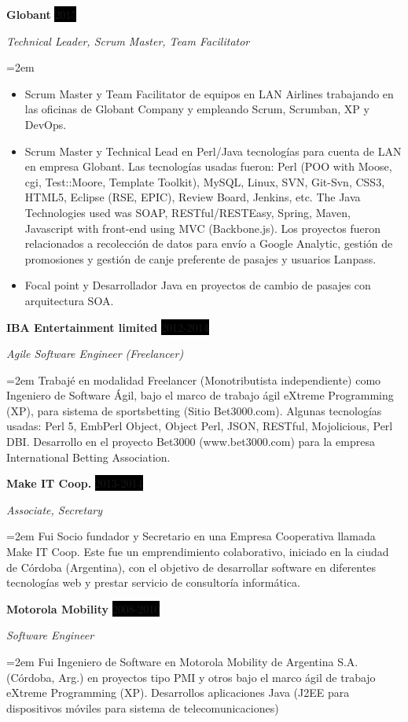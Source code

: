 \documentclass[paper=a4,fontsize=11pt]{scrartcl} %
\newcommand{\sepspace}{\vspace*{1em}}		%
\newcommand{\EducationEntry}[4]{
		\noindent \textbf{#1} \hfill      %
		\colorbox{Black}{%
			\parbox{6em}{%
			\hfill\color{White}#2}} \par  %
		\noindent \textit{#3} \par        %
		\noindent\hangindent=2em\hangafter=0 \small #4 %
		\normalsize \par}
\newcommand{\WorkEntry}[4]{				  %
		\noindent \textbf{#1} \hfill      %
		\colorbox{Black}{\color{White}#2} \par  %
		\noindent \textit{#3} \par              %
		\noindent\hangindent=2em\hangafter=0 \small #4 %
		\normalsize \par}
\begin{document}
\sepspace

\WorkEntry{Globant}{2015}{Technical Leader, Scrum Master, Team Facilitator}
{
\begin{itemize}
\item Scrum Master y Team Facilitator de equipos en LAN Airlines trabajando en las oficinas de Globant Company y empleando Scrum, Scrumban, XP y DevOps.
\item Scrum Master y Technical Lead en Perl/Java tecnologías para cuenta de LAN en empresa Globant. Las tecnologías usadas fueron: Perl (POO with Moose, cgi, Test::Moore, Template Toolkit), MySQL, Linux, SVN, Git-Svn, CSS3, HTML5, Eclipse (RSE, EPIC), Review Board, Jenkins, etc. The Java Technologies used was SOAP, RESTful/RESTEasy, Spring, Maven, Javascript with front-end using MVC (Backbone.js). Los proyectos fueron  relacionados a recolección de datos para envío a Google Analytic, gestión de promosiones y gestión de canje preferente de pasajes y usuarios Lanpass.
\item Focal point y Desarrollador Java en proyectos de cambio de pasajes con arquitectura SOA.
\end{itemize}
}

\sepspace

\WorkEntry{IBA Entertainment limited}{2012-2014}{Agile Software Engineer (Freelancer)}
{Trabajé en modalidad Freelancer (Monotributista independiente) como Ingeniero de Software Ágil, bajo el marco de trabajo ágil eXtreme Programming (XP), para sistema de sportsbetting (Sitio Bet3000.com). Algunas tecnologías usadas: Perl 5, EmbPerl Object, Object Perl, JSON, RESTful, Mojolicious, Perl DBI. Desarrollo en el proyecto Bet3000 (www.bet3000.com) para la empresa International Betting Association.}

\sepspace

\WorkEntry{Make IT Coop.}{2013-2014}{Associate, Secretary}{
Fui Socio fundador y Secretario en una Empresa Cooperativa llamada Make IT Coop. Este fue un emprendimiento colaborativo, iniciado en la ciudad de Córdoba (Argentina), con el objetivo de desarrollar software en diferentes tecnologías web y prestar servicio de consultoría informática.
}

\sepspace

\WorkEntry{Motorola Mobility}{2008-2010}{Software Engineer}
{Fui Ingeniero de Software en Motorola Mobility de Argentina S.A. (Córdoba, Arg.) en proyectos tipo PMI y otros bajo el marco ágil de trabajo eXtreme Programming (XP). Desarrollos aplicaciones Java (J2EE para dispositivos móviles para sistema de telecomunicaciones)}
\end{document}
